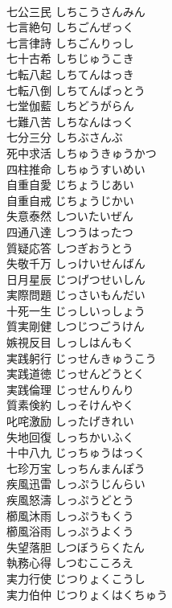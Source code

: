 \documentclass[8pt]{extreport}
\begin{document}
\begin{CJK}{UTF8}{min}
\\	七公三民	しちこうさんみん	
\\	七言絶句	しちごんぜっく	
\\	七言律詩	しちごんりっし	
\\	七十古希	しちじゅうこき	
\\	七転八起	しちてんはっき	
\\	七転八倒	しちてんばっとう	
\\	七堂伽藍	しちどうがらん	
\\	七難八苦	しちなんはっく	
\\	七分三分	しちぶさんぶ	
\\	死中求活	しちゅうきゅうかつ	
\\	四柱推命	しちゅうすいめい	
\\	自重自愛	じちょうじあい	
\\	自重自戒	じちょうじかい	
\\	失意泰然	しついたいぜん	
\\	四通八達	しつうはったつ	
\\	質疑応答	しつぎおうとう	
\\	失敬千万	しっけいせんばん	
\\	日月星辰	じつげつせいしん	
\\	実際問題	じっさいもんだい	
\\	十死一生	じっしいっしょう	
\\	質実剛健	しつじつごうけん	
\\	嫉視反目	しっしはんもく	
\\	実践躬行	じっせんきゅうこう	
\\	実践道徳	じっせんどうとく	
\\	実践倫理	じっせんりんり	
\\	質素倹約	しっそけんやく	
\\	叱咤激励	しったげきれい	
\\	失地回復	しっちかいふく	
\\	十中八九	じっちゅうはっく	
\\	七珍万宝	しっちんまんぽう	
\\	疾風迅雷	しっぷうじんらい	
\\	疾風怒濤	しっぷうどとう	
\\	櫛風沐雨	しっぷうもくう	
\\	櫛風浴雨	しっぷうよくう	
\\	失望落胆	しつぼうらくたん	
\\	執務心得	しつむこころえ	
\\	実力行使	じつりょくこうし	
\\	実力伯仲	じつりょくはくちゅう	

\end{CJK}
\end{document}
